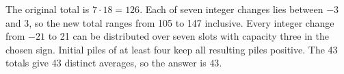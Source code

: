 The original total is $7\cdot18=126$. Each of seven integer changes lies between $-3$ and 3, so the new total ranges from 105 to 147 inclusive. Every integer change from $-21$ to 21 can be distributed over seven slots with capacity three in the chosen sign. Initial piles of at least four keep all resulting piles positive. The 43 totals give 43 distinct averages, so the answer is $\boxed{43}$.
